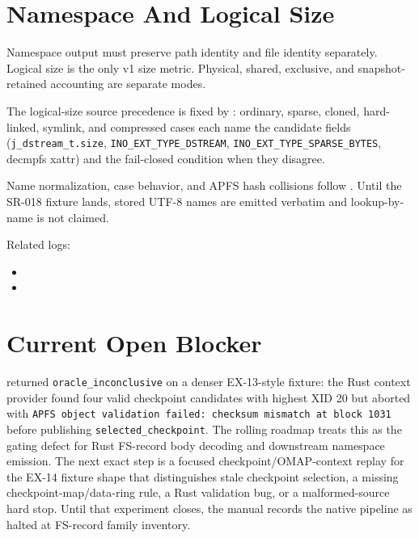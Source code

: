 \section{Namespace And Logical Size}

Namespace output must preserve path identity and file identity separately.
Logical size is the only v1 size metric. Physical, shared, exclusive, and
snapshot-retained accounting are separate modes.

The logical-size source precedence is fixed by
: ordinary,
sparse, cloned, hard-linked, symlink, and compressed cases each name the
candidate fields (\texttt{j\_dstream\_t.size}, \texttt{INO\_EXT\_TYPE\_DSTREAM},
\texttt{INO\_EXT\_TYPE\_SPARSE\_BYTES}, decmpfs xattr) and the fail-closed
condition when they disagree.

Name normalization, case behavior, and APFS hash collisions follow
. Until the
SR-018 fixture lands, stored UTF-8 names are emitted verbatim and lookup-by-name
is not claimed.

Related logs:

\begin{itemize}
  \item {}
  \item {}
\end{itemize}

\section{Current Open Blocker}

 returned
\texttt{oracle\_inconclusive} on a denser EX-13-style fixture: the Rust context
provider found four valid checkpoint candidates with highest XID 20 but
aborted with \texttt{APFS object validation failed: checksum mismatch at block
1031} before publishing \texttt{selected\_checkpoint}. The rolling roadmap
 treats this
as the gating defect for Rust FS-record body decoding and downstream namespace
emission. The next exact step is a focused checkpoint/OMAP-context replay for
the EX-14 fixture shape that distinguishes stale checkpoint selection, a
missing checkpoint-map/data-ring rule, a Rust validation bug, or a
malformed-source hard stop. Until that experiment closes, the manual records
the native pipeline as halted at FS-record family inventory.
